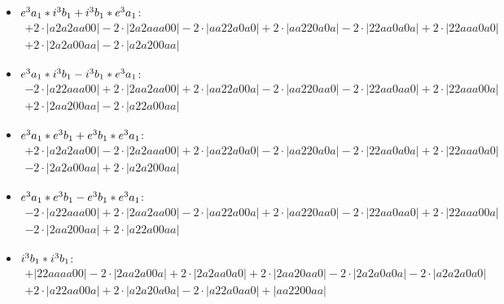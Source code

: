 \documentclass{article}
\begin{document}
\begin{itemize}
$$\begin{array}{c}
\end{array}$$
\item \boldmath$e^3 a_1 * i^3 b_{1} + i^3 b_{1} * e^3 a_1 \displaystyle $\unboldmath : \quad$$\begin{array}{c}
+2 \cdot \left|a2a2aa00\right| -2 \cdot \left|2a2aaa00\right| -2 \cdot \left|aa22a0a0\right| +2 \cdot \left|aa220a0a\right| -2 \cdot \left|22aa0a0a\right| +2 \cdot \left|22aaa0a0\right| \\[0.5cm] +2 \cdot \left|2a2a00aa\right| -2 \cdot \left|a2a200aa\right|
\end{array}$$
\item \boldmath$e^3 a_1 * i^3 b_{1} - i^3 b_{1} * e^3 a_1 \displaystyle $\unboldmath : \quad$$\begin{array}{c}
-2 \cdot \left|a22aaa00\right| +2 \cdot \left|2aa2aa00\right| +2 \cdot \left|aa22a00a\right| -2 \cdot \left|aa220aa0\right| -2 \cdot \left|22aa0aa0\right| +2 \cdot \left|22aaa00a\right| \\[0.5cm] +2 \cdot \left|2aa200aa\right| -2 \cdot \left|a22a00aa\right|
\end{array}$$
\item \boldmath$e^3 a_1 * e^3 b_{1} + e^3 b_{1} * e^3 a_1 \displaystyle $\unboldmath : \quad$$\begin{array}{c}
+2 \cdot \left|a2a2aa00\right| -2 \cdot \left|2a2aaa00\right| +2 \cdot \left|aa22a0a0\right| -2 \cdot \left|aa220a0a\right| -2 \cdot \left|22aa0a0a\right| +2 \cdot \left|22aaa0a0\right| \\[0.5cm] -2 \cdot \left|2a2a00aa\right| +2 \cdot \left|a2a200aa\right|
\end{array}$$
\item \boldmath$e^3 a_1 * e^3 b_{1} - e^3 b_{1} * e^3 a_1 \displaystyle $\unboldmath : \quad$$\begin{array}{c}
-2 \cdot \left|a22aaa00\right| +2 \cdot \left|2aa2aa00\right| -2 \cdot \left|aa22a00a\right| +2 \cdot \left|aa220aa0\right| -2 \cdot \left|22aa0aa0\right| +2 \cdot \left|22aaa00a\right| \\[0.5cm] -2 \cdot \left|2aa200aa\right| +2 \cdot \left|a22a00aa\right|
\end{array}$$
\item \boldmath$i^3 b_{1} * i^3 b_{1} \displaystyle $\unboldmath : \quad$$\begin{array}{c}
+\left|22aaaa00\right| -2 \cdot \left|2aa2a00a\right| +2 \cdot \left|2a2aa0a0\right| +2 \cdot \left|2aa20aa0\right| -2 \cdot \left|2a2a0a0a\right| -2 \cdot \left|a2a2a0a0\right| \\[0.5cm] +2 \cdot \left|a22aa00a\right| +2 \cdot \left|a2a20a0a\right| -2 \cdot \left|a22a0aa0\right| +\left|aa2200aa\right|

\end{array}$$
\end{itemize}
\end{document}
